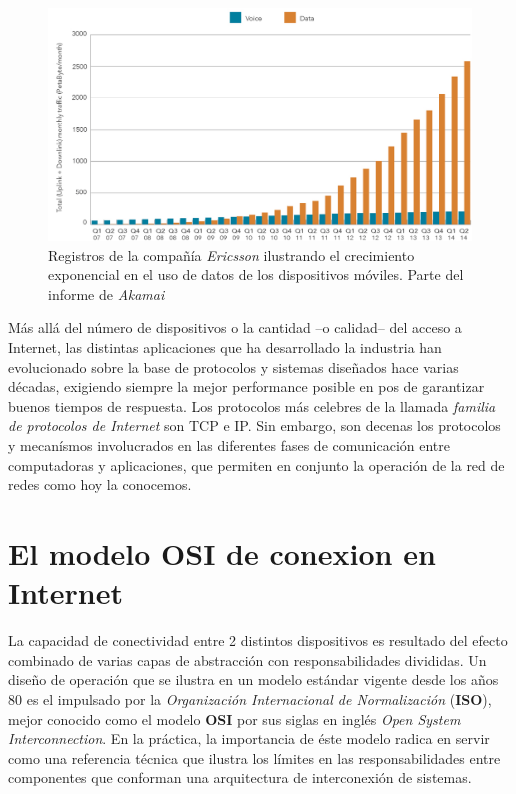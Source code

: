 \begin{figure}[!h]
	\centering
	\includegraphics[scale=0.5]{imagenes/conexiones_moviles}
	\caption{Registros de la compañía \emph{Ericsson} ilustrando el crecimiento exponencial en el uso de datos de los dispositivos móviles. Parte del informe de \emph{Akamai} \cite{report:akamai}}
	\label{fig:akamai_stats}
\end{figure}

Más allá del número de dispositivos o la cantidad --o calidad-- del acceso a Internet, las distintas aplicaciones que ha desarrollado la industria han evolucionado sobre la base de protocolos y sistemas diseñados hace varias décadas, exigiendo siempre la mejor performance posible en pos de garantizar buenos tiempos de respuesta. Los protocolos más celebres de la llamada \emph{familia de protocolos de Internet} son TCP e IP. Sin embargo, son decenas los protocolos y mecanísmos involucrados en las diferentes fases de comunicación entre computadoras y aplicaciones, que permiten en conjunto la operación de la red de redes como hoy la conocemos.

\section{El modelo OSI de conexion en Internet}
La capacidad de conectividad entre 2 distintos dispositivos es resultado del efecto combinado de varias capas de abstracción con responsabilidades divididas. Un diseño de operación que se ilustra en un modelo estándar vigente desde los años 80 es el impulsado por la \emph{Organización Internacional de Normalización} (\textbf{ISO}), mejor conocido como el modelo \textbf{OSI} por sus siglas en inglés \emph{Open System Interconnection}. En la práctica, la importancia de éste modelo radica en servir como una referencia técnica que ilustra los límites en las responsabilidades entre componentes que conforman una arquitectura de interconexión de sistemas.

